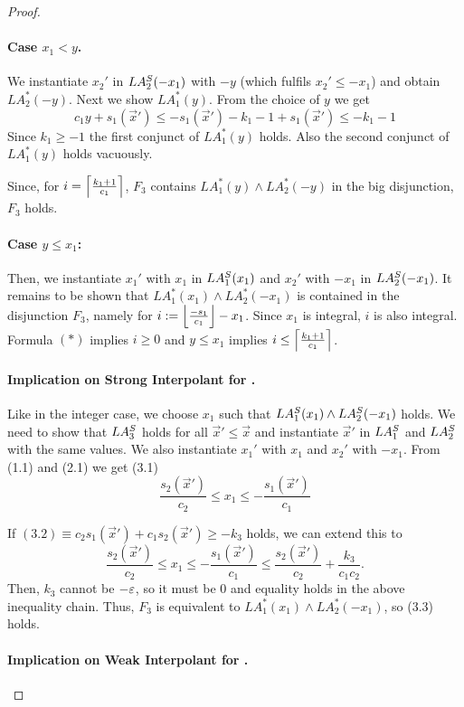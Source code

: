 \begin{techreport}
\begin{proof}
\paragraph{Case $x_1 < y$.}
We instantiate $x_2'$ in $LA\S_2(-x_1)$ with $-y$ (which fulfils $x_2' \leq
-x_1$) and obtain $LA^*_2(-y)$.
Next we show $LA^*_1(y)$.  From the choice of $y$ we get
\[c_1 y + s_1(\vec x') \leq -s_1(\vec x')-k_1-1 + s_1(\vec x') \leq -k_1 -1\]
Since $k_1\geq -1$ the first conjunct of $LA^*_1(y)$ holds. Also the second conjunct
of $LA^*_1(y)$ holds vacuously.

Since, for $i=\ceilfrac{k_1+1}{c_1}$, $F_3$ contains $LA^*_1(y) \land
LA^*_2(-y)$ in the big disjunction, $F_3$ holds.

\paragraph{Case $y\leq x_1$:}
Then, we instantiate $x_1'$ with $x_1$ in $LA\S_1(x_1)$ and $x_2'$ with $-x_1$
in $LA\S_2(-x_1)$.
It remains to be shown that $LA^*_1(x_1) \land LA^*_2(-x_1)$ is contained
in the disjunction $F_3$, namely for $i:= \floorfrac{-s_1}{c_1} - x_1$.  Since
$x_1$ is integral, $i$ is also integral.  Formula $(*)$ implies $i\geq 0$ and
$y\leq x_1$ implies $i\leq \ceilfrac{k_1+1}{c_1}$.

\paragraph*{Implication on Strong Interpolant for \laq.}
Like in the integer case, 
we choose $x_1$ such that $LA\S_1(x_1) \land LA\S_2(-x_1)$ holds.  We
need to show that $LA\S_3$ holds for all $\vec x' \leq \vec x$ and instantiate
$\vec x'$ in $LA\S_1$ and $LA\S_2$ with the same values.  We also instantiate 
$x_1'$ with $x_1$ and $x_2'$ with $-x_1$. From (1.1) and (2.1) we get (3.1)
\[\frac{s_2(\vec x')}{c_2} \leq x_1 \leq -\frac{s_1(\vec x')}{c_1} \tag{$*$}\]

If $(3.2)\equiv c_2s_1(\vec x') + c_1s_2(\vec x') \geq -k_3$ holds, we can extend
this to
\[\frac{s_2(\vec x')}{c_2} \leq x_1
\leq -\frac{s_1(\vec x')}{c_1} \leq \frac{s_2(\vec x')}{c_2} +
\frac{k_3}{c_1c_2}.\]
Then, $k_3$ cannot be $-\eps$, so it must be $0$ and equality holds in the
above inequality chain.  Thus, $F_3$ is equivalent to $LA^*_1(x_1) \land
LA^*_2(-x_1)$, so (3.3) holds.

\paragraph*{Implication on Weak Interpolant for \laz.}


\end{proof}
\end{techreport}

